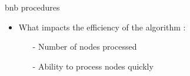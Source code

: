 \documentclass[final]{beamer}
\newlength{\onecolwid}
\newlength{\twocolwid}
\begin{document}
\begin{frame}[t]
\begin{columns}[t]
\begin{column}{\twocolwid}
\begin{columns}[t,totalwidth=\twocolwid]
\begin{column}{\onecolwid}
\begin{block}{\gls{bnb} procedures}
\begin{itemize}
\begin{itemize}
                    \end{itemize}
                \end{itemize}
                \begin{itemize}
                    \item \hspace*{0.1em} What impacts the efficiency of the algorithm :
                    \begin{itemize}
                        \normalsize \item[-] \hspace*{0.1em} Number of nodes processed
                        \item[-] \hspace*{0.1em} Ability to process nodes quickly
                    \end{itemize}
                \end{itemize}
            \end{block}
        \end{column}


\end{columns}
\end{column}
\end{columns}
\end{frame}
\end{document}
